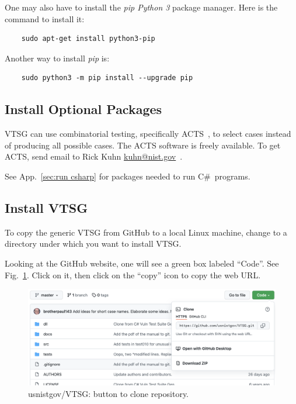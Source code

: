 \documentclass[12pt]{article}
\newcommand{\CSharp}{C{\fontseries{b}\selectfont\#}}
\begin{document}
\noindent One may also have to install the \emph{pip Python 3} package manager.
Here is the command to install it:

\begin{verbatim}
    sudo apt-get install python3-pip
\end{verbatim}

\noindent Another way to install \emph{pip} is:

\begin{verbatim}
    sudo python3 -m pip install --upgrade pip
\end{verbatim}

\subsection{Install Optional Packages}

VTSG can use combinatorial testing, specifically ACTS~\cite{ACTS2013}, to select
cases instead of producing all possible cases.  The ACTS software is freely available.
To get ACTS, send email to Rick Kuhn
\href{mailto:kuhn@nist.gov}{kuhn@nist.gov}~\cite{CombinTesting}.

See App.~\ref{sec:run csharp} for packages needed to run \CSharp\ programs.

\subsection{Install VTSG}

\noindent To copy the generic VTSG from GitHub to a local Linux machine, change to a
directory under which you want to install VTSG.

\noindent Looking at the GitHub website, one will see a green box labeled ``Code''.
See Fig.~\ref{fig:clone button}.
Click on it, then click on the ``copy'' icon to copy the web URL.

\begin{figure}[htbp]
  \includegraphics[width=1\linewidth]{fig_clone_tab.png}
  \caption{usnistgov/VTSG: button to clone repository.}
  \label{fig:clone button}
\end{figure}
\end{document}
